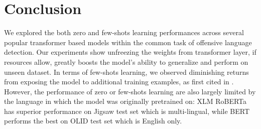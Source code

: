 \documentclass[11pt,a4paper]{article}
\begin{document}
\section{Conclusion}
We explored the both zero and few-shots learning performances across several popular transformer based models within the common task of offensive language detection. Our experiments show unfreezing the weights from transformer layer, if resources allow, greatly boosts the model's ability to generalize and perform on unseen dataset. In terms of few-shots learning, we observed diminishing returns from exposing the model to additional training examples, as first cited in \citep{cer2018universal}. However, the performance of zero or few-shots learning are also largely limited by the language in which the model was originally pretrained on: XLM RoBERTa has superior performance on Jigsaw test set which is multi-lingual, while BERT performs the best on OLID test set which is English only. 



\end{document}
